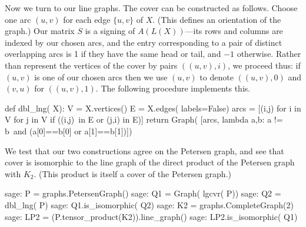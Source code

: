 Now we turn to our line graphs. The cover can be constructed as follows.
Choose one arc $(u,v)$ for each edge $\{u,v\}$ of $X$. (This defines an orientation
of the graph.) Our matrix $S$ is a signing of $A(L(X))$---its rows and columns
are indexed by our chosen arcs, and the entry corresponding to a pair
of distinct overlapping arcs is 1 if they have the same head or tail,
and $-1$ otherwise. Rather than represent the vertices of the cover by
pairs $((u,v),i)$, we proceed thus: if $(u,v)$ is one of our chosen
arcs then we use $(u,v)$ to denote $((u,v),0)$ and $(v,u)$ for $((u,v),1)$.
The following procedure implements this.
\begin{sageblock}
def dbl_lng( X):
    V = X.vertices()
    E = X.edges( labels=False)
    arcs = [(i,j) for i in V for j in V if ((i,j)\
     in E or (j,i) in E)]
    return  Graph( [arcs, lambda a,b: a != b\
     and (a[0]==b[0] or a[1]==b[1])])
\end{sageblock}

We test that our two constructions agree on the Petersen graph, and see
that cover is isomorphic to the line graph of the direct product of
the Petersen graph with $K_2$. (This product is itself a cover of the Petersen
graph.)
\begin{sageexample}
sage: P = graphs.PetersenGraph()
sage: Q1 = Graph( lgcvr( P))
sage: Q2 = dbl_lng( P)
sage: Q1.is_isomorphic( Q2)
sage: K2 = graphs.CompleteGraph(2)
sage: LP2 = (P.tensor_product(K2)).line_graph()
sage: LP2.is_isomorphic( Q1)
\end{sageexample}
